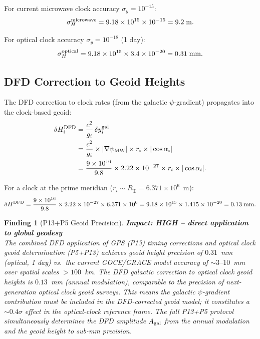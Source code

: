 \documentclass[aps,prd,twocolumn,superscriptaddress,nofootinbib]{revtex4-2}
\newtheorem{finding}{Finding}
\begin{document}
For current microwave clock accuracy $\sigma_y = 10^{-15}$:
\begin{equation}
\sigma_H^{\rm microwave} = 9.18\times10^{15}\times10^{-15} = 9.2\;\text{m}.
\end{equation}

For optical clock accuracy $\sigma_y = 10^{-18}$ (1 day):
\begin{equation}
\sigma_H^{\rm optical} = 9.18\times10^{15}\times3.4\times10^{-20}
= 0.31\;\text{mm}.
\label{eq:geoid_optical}
\end{equation}

\subsection{DFD Correction to Geoid Heights}

The DFD correction to clock rates (from the galactic $\psi$-gradient)
propagates into the clock-based geoid:
\begin{align}
\delta H_i^{\rm DFD}
&= \frac{c^2}{g_i}\,\delta y_i^{\rm gal}\nonumber\\
&= \frac{c^2}{g_i}\times|\nabla\psi_{\rm MW}|\times r_i\times|\cos\alpha_i|\nonumber\\
&= \frac{9\times10^{16}}{9.8}\times2.22\times10^{-27}
  \times r_i\times|\cos\alpha_i|.
\label{eq:geoid_DFD}
\end{align}

For a clock at the prime meridian ($r_i \sim R_\oplus = 6.371\times10^6$~m):
\begin{equation}
\delta H^{\rm DFD} = \frac{9\times10^{16}}{9.8}\times2.22\times10^{-27}
\times6.371\times10^6
= 9.18\times10^{15}\times1.415\times10^{-20}
= 0.13\;\text{mm}.
\label{eq:geoid_DFD_num}
\end{equation}

\begin{finding}[P13+P5 Geoid Precision]
\label{find:geoid}
\textbf{Impact: HIGH -- direct application to global geodesy}\\
The combined DFD application of GPS (P13) timing corrections and optical
clock geoid determination (P5+P13) achieves geoid height precision of
$0.31$~mm (optical, 1 day) vs.\ the current GOCE/GRACE model accuracy
of $\sim 3$--$10$~mm over spatial scales $> 100$~km. The DFD galactic
correction to optical clock geoid heights is $0.13$~mm (annual modulation),
comparable to the precision of next-generation optical clock geoid surveys.
This means the galactic $\psi$-gradient contribution must be included in
the DFD-corrected geoid model; it constitutes a $\sim 0.4\sigma$ effect
in the optical-clock reference frame. The full P13+P5 protocol simultaneously
determines the DFD amplitude $A_{\rm gal}$ from the annual modulation and
the geoid height to sub-mm precision.
\end{finding}
\end{document}

